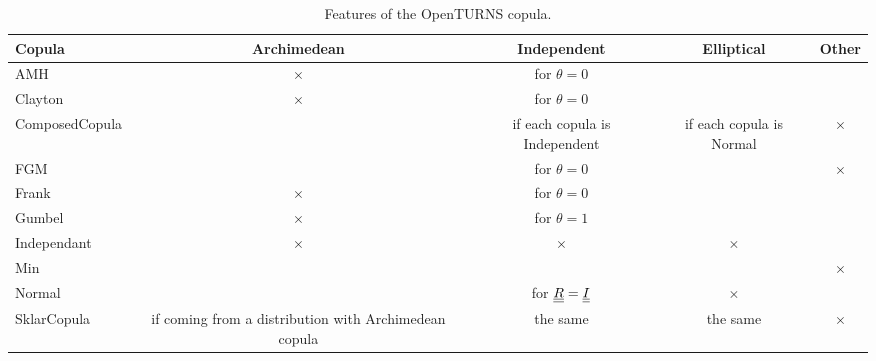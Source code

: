 \begin{table}[H]
  \begin{center}
    \begin{tabular}{|l|c|c|c|c|}
      \hline
      Copula & Archimedean & Independent & Elliptical & Other \\
      \hline
      AMH & $\times$ & for $\theta = 0$ &  & \\
      \hline
      Clayton & $\times$ &  for $\theta = 0$ & &\\
      \hline
      ComposedCopula & & \parbox[c]{4cm}{if each copula is Independent} & \parbox[c]{4cm}{if each copula is Normal} & $\times$ \\
      \hline
      FGM & & for $\theta = 0$ & & $\times$ \\
      \hline
      Frank & $\times$ & for $\theta = 0$ & &\\
      \hline
      Gumbel & $\times$ & for $\theta = 1 $ & &\\
      \hline
      Independant &$\times$ & $\times$& $\times$&\\
      \hline
      Min & & & &$\times$\\
      \hline
      Normal & & for ${\underline{\underline{R}}} = {\underline{\underline{I}}}$ & $\times$ &\\
      \hline
      SklarCopula & \parbox[c]{4cm}{if coming from a distribution with Archimedean copula}& the same & the same & $\times$ \\
      \hline
    \end{tabular}
    \caption{Features of the OpenTURNS copula.}
    \label{CaracCopulas}
  \end{center}
\end{table}
\textspace\\





\newcommand\B{\rule[-2.4ex]{0pt}{0pt}}
\newcommand\Top{\rule{0pt}{4.8ex}}


